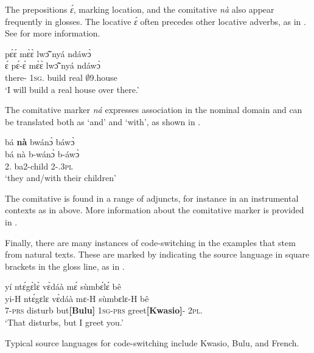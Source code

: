 The prepositions {\itshape ɛ́}, marking location, and the comitative  {\itshape nà} also appear frequently in glosses. The locative {\it ɛ́} often precedes other locative adverbs, as in . See  for more information.

\ea \label{Gloc}
   pɛ́ɛ́ mɛ̀ɛ̀ lwɔ̃̂ nyá ndáwɔ̀ \\
         ɛ́ pɛ́-ɛ́ mɛ̀ɛ̀ lwɔ̃̂ nyá ndáwɔ̀ \\
          {\LOC} there-{\DIST} 1\textsc{sg}.{\FUT} build real $\emptyset$9.house \\
    \trans `I will build a real house over there.'
\z

The comitative marker {\it ná} expresses association in the nominal domain and can be translated both as `and' and `with', as shown in .

\ea \label{Gcom}
  \glll  bá {\bfseries nà} bwánɔ̀ báwɔ̀ \\
         bá nà b-wánɔ̀ b-áwɔ̀\\
           2.{\SBJ} {\COM} ba2-child 2-{\POSS}.3\textsc{pl}  \\
    \trans `they and/with their children'
\z

The comitative is found in a range of adjuncts, for instance in an instrumental contexts as in  above. More information about the comitative marker is provided in .

Finally, there are many instances of code-switching in the examples that stem from natural texts. These are marked by indicating the source language in square brackets in the gloss line, as in .

\ea \label{GCS}
  \glll      yí ntɛ́gɛ̀lɛ̀ vɛ̀dáà mɛ́ sùmbɛ́lɛ́ bê \\
           yi-H ntɛ́gɛlɛ vɛ̀dáà mɛ-H sùmbɛlɛ-H bê \\
              7-\textsc{prs} disturb but{\bfseries [Bulu]} 1\textsc{sg}-\textsc{prs} greet{\bfseries [Kwasio]}-{\R} 2\textsc{pl}.{\OBJ} \\
    \trans `That disturbs, but I greet you.'
\z


Typical source languages for code-switching include Kwasio, Bulu, and French. 











